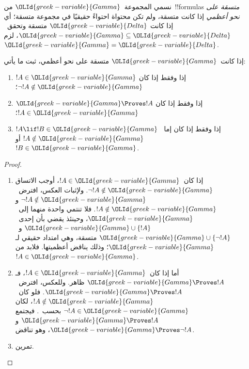 \documentclass[../../../include/open-logic-section]{subfiles}
\begin{document}


\begin{defn}
نسمي المجموعة~${\OLId{greek-variable}{Gamma}}$ من~!!{formula}s \emph{متسقة على نحو أعظمي} إذا
كانت متسقة، ولم تكن محتواة احتواءً حقيقيًا في مجموعة متسقة؛ أي إذا كانت
${\OLId{greek-variable}{Delta}}$ متسقة وتحقق~${\OLId{greek-variable}{Gamma}}\subseteq{\OLId{greek-variable}{Delta}}$، لزم~${\OLId{greek-variable}{Gamma}}={\OLId{greek-variable}{Delta}}$.
\end{defn}

\begin{lem}[لمّة الصدق]
إذا كانت~${\OLId{greek-variable}{Gamma}}$ متسقة على نحو أعظمي، ثبت ما يأتي:
\begin{enumerate}
\item {} $!A\in{\OLId{greek-variable}{Gamma}}$ إذا وفقط إذا كان
  $\lnot !A\notin{\OLId{greek-variable}{Gamma}}$؛
\item {} ${\OLId{greek-variable}{Gamma}}\Proves !A$ إذا وفقط إذا كان
  $!A\in{\OLId{greek-variable}{Gamma}}$؛
\item {} $!A\lif !B\in{\OLId{greek-variable}{Gamma}}$ إذا وفقط إذا كان
  إما~$!A\notin{\OLId{greek-variable}{Gamma}}$ أو~$!B\in{\OLId{greek-variable}{Gamma}}$.
\end{enumerate}
\end{lem}

\begin{proof}
\begin{enumerate}
\item إذا كان~$!A\in{\OLId{greek-variable}{Gamma}}$، أوجب الاتساق
  $\lnot !A\notin{\OLId{greek-variable}{Gamma}}$. ولإثبات العكس، افترض~$\lnot !A\notin{\OLId{greek-variable}{Gamma}}$
  و$!A\notin{\OLId{greek-variable}{Gamma}}$. فلا تنتمي واحدة منهما إلى~${\OLId{greek-variable}{Gamma}}$، وحينئذ يقضي
   بأن إحدى~${\OLId{greek-variable}{Gamma}}\cup\{!A\}$
  و~${\OLId{greek-variable}{Gamma}}\cup\{\lnot !A\}$ متسقة، وهي امتداد حقيقي لـ${\OLId{greek-variable}{Gamma}}$؛ وذلك
  يناقض أعظميتها. فلابد من~$!A\in{\OLId{greek-variable}{Gamma}}$.
\item أما إذا كان~$!A\in{\OLId{greek-variable}{Gamma}}$، فـ${\OLId{greek-variable}{Gamma}}\Proves !A$ ظاهر. وللعكس،
  افترض~${\OLId{greek-variable}{Gamma}}\Proves !A$. فلو كان~$!A\notin{\OLId{greek-variable}{Gamma}}$، لكان
  $\lnot !A\in{\OLId{greek-variable}{Gamma}}$ بحسب~. فيجتمع
  ${\OLId{greek-variable}{Gamma}}\Proves !A$ و${\OLId{greek-variable}{Gamma}}\Proves\lnot !A$، وهو تناقض.
\item تمرين.
\end{enumerate}
\end{proof}
\end{document}

